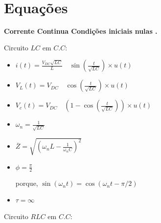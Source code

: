 \part{Equa\c{c}\~{o}es} \label{eq}
\begin{flushleft}
{\bf Corrente Continua Condi\c{c}\~{o}es  iniciais  nulas .}
\end{flushleft}
\quad Circuito  $LC$ em $C.C$:\par
%
\begin{itemize}
\item
$i(t)=\frac{V_{DC}\sqrt{LC}}{L}\quad \sin \left( \frac{t}{\sqrt{LC}}\right)\times u(t)$\par
\item
$V_L(t)=V_{DC}\quad \cos\left(\frac{t}{\sqrt{LC}} \right)\times u(t)$\par
\item
$V_c(t)=V_{DC}\quad \left(1-\cos\left(\frac{t}{\sqrt{LC}} \right) \right)\times u(t)$\par
\item
$\omega_n=\frac{1}{\sqrt{LC}}$\par
\item
$\overline{Z}=\sqrt{(\omega_n L-\frac{1}{\omega_n C})^2}$\par
\item
$\phi=\frac{\pi}{2}$\par
porque, $\sin(\omega_n t)= \cos(\omega_n t - \pi/2)$\par
\item
$\tau=\infty$\par
\end{itemize}
%
\quad Circuito  $RLC$ em $C.C$:\par
%
